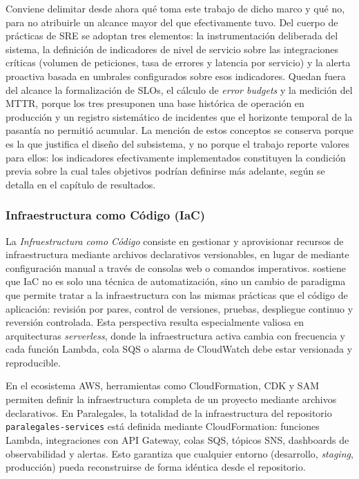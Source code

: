 Conviene delimitar desde ahora qué toma este trabajo de dicho marco y qué no, para no atribuirle un alcance mayor del que efectivamente tuvo. Del cuerpo de prácticas de SRE se adoptan tres elementos: la instrumentación deliberada del sistema, la definición de indicadores de nivel de servicio sobre las integraciones críticas (volumen de peticiones, tasa de errores y latencia por servicio) y la alerta proactiva basada en umbrales configurados sobre esos indicadores. Quedan fuera del alcance la formalización de SLOs, el cálculo de \textit{error budgets} y la medición del MTTR, porque los tres presuponen una base histórica de operación en producción y un registro sistemático de incidentes que el horizonte temporal de la pasantía no permitió acumular. La mención de estos conceptos se conserva porque es la que justifica el diseño del subsistema, y no porque el trabajo reporte valores para ellos: los indicadores efectivamente implementados constituyen la condición previa sobre la cual tales objetivos podrían definirse más adelante, según se detalla en el capítulo de resultados.

\subsubsection{Infraestructura como Código (IaC)}

La \textit{Infraestructura como Código} consiste en gestionar y aprovisionar recursos de infraestructura mediante archivos declarativos versionables, en lugar de mediante configuración manual a través de consolas web o comandos imperativos. \textcite{Morris2020} sostiene que IaC no es solo una técnica de automatización, sino un cambio de paradigma que permite tratar a la infraestructura con las mismas prácticas que el código de aplicación: revisión por pares, control de versiones, pruebas, despliegue continuo y reversión controlada. Esta perspectiva resulta especialmente valiosa en arquitecturas \textit{serverless}, donde la infraestructura activa cambia con frecuencia y cada función Lambda, cola SQS o alarma de CloudWatch debe estar versionada y reproducible.

En el ecosistema AWS, herramientas como CloudFormation, CDK y SAM permiten definir la infraestructura completa de un proyecto mediante archivos declarativos. En Paralegales, la totalidad de la infraestructura del repositorio \texttt{paralegales-services} está definida mediante CloudFormation: funciones Lambda, integraciones con API Gateway, colas SQS, tópicos SNS, dashboards de observabilidad y alertas. Esto garantiza que cualquier entorno (desarrollo, \textit{staging}, producción) pueda reconstruirse de forma idéntica desde el repositorio.

